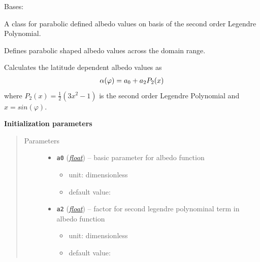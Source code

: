 \documentclass[letterpaper,10pt,english]{sphinxmanual}
\begin{document}
\begin{fulllineitems}
\label{api/climlab.surface:climlab.surface.albedo.P2Albedo}
Bases: {\hyperref[api/climlab.process:climlab.process.diagnostic.DiagnosticProcess]{\emph{}}}

A class for parabolic defined albedo values on basis of the second order
Legendre Polynomial.

Defines parabolic shaped albedo values across the domain range.

Calculates the latitude dependent albedo values as
\begin{gather}
\begin{split}\alpha(\varphi) = a_0 + a_2 P_2(x)\end{split}\notag
\end{gather}
where \(P_2(x) = \frac{1}{2} (3x^2 - 1)\) is the second order Legendre Polynomial
and \(x=sin(\varphi)\).

\textbf{Initialization parameters}
\begin{quote}\begin{description}
\item[{Parameters}] \leavevmode\begin{itemize}
\item {} 
\textbf{\texttt{a0}} (\href{http://docs.python.org/2.7/library/functions.html\#float}{\emph{float}}) -- 
basic parameter for albedo function
\begin{itemize}
\item {} 
unit: dimensionless

\item {} 
default value: 

\end{itemize}


\item {} 
\textbf{\texttt{a2}} (\href{http://docs.python.org/2.7/library/functions.html\#float}{\emph{float}}) -- 
factor for second legendre polynominal term in albedo function
\begin{itemize}
\item {} 
unit: dimensionless

\item {} 
default value: 

\end{itemize}


\end{itemize}


\end{description}
\end{quote}
\end{fulllineitems}
\end{document}
